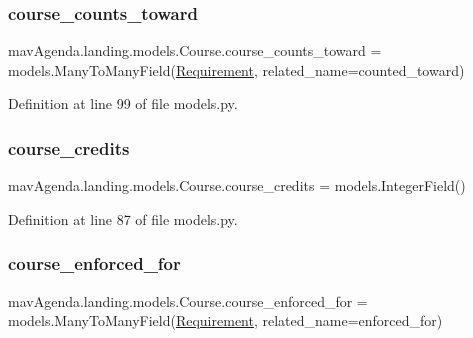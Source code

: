 \subsubsection{\texorpdfstring{course\+\_\+counts\+\_\+toward}{course\_counts\_toward}}
{\footnotesize\ttfamily mav\+Agenda.\+landing.\+models.\+Course.\+course\+\_\+counts\+\_\+toward = models.\+Many\+To\+Many\+Field(\mbox{\hyperlink{classmavAgenda_1_1landing_1_1models_1_1Requirement}{Requirement}}, related\+\_\+name=\textquotesingle{}counted\+\_\+toward\textquotesingle{})\hspace{0.3cm}{\ttfamily [static]}}



Definition at line 99 of file models.\+py.

\mbox{\label{classmavAgenda_1_1landing_1_1models_1_1Course_a9292fd2a8b1f5acd72a96b5e0ff2cda0}} 
\subsubsection{\texorpdfstring{course\+\_\+credits}{course\_credits}}
{\footnotesize\ttfamily mav\+Agenda.\+landing.\+models.\+Course.\+course\+\_\+credits = models.\+Integer\+Field()\hspace{0.3cm}{\ttfamily [static]}}



Definition at line 87 of file models.\+py.

\mbox{\label{classmavAgenda_1_1landing_1_1models_1_1Course_ab4dbdb33b64f85c6dd36539868a4d3ad}} 
\subsubsection{\texorpdfstring{course\+\_\+enforced\+\_\+for}{course\_enforced\_for}}
{\footnotesize\ttfamily mav\+Agenda.\+landing.\+models.\+Course.\+course\+\_\+enforced\+\_\+for = models.\+Many\+To\+Many\+Field(\mbox{\hyperlink{classmavAgenda_1_1landing_1_1models_1_1Requirement}{Requirement}}, related\+\_\+name=\textquotesingle{}enforced\+\_\+for\textquotesingle{})\hspace{0.3cm}{\ttfamily [static]}}



